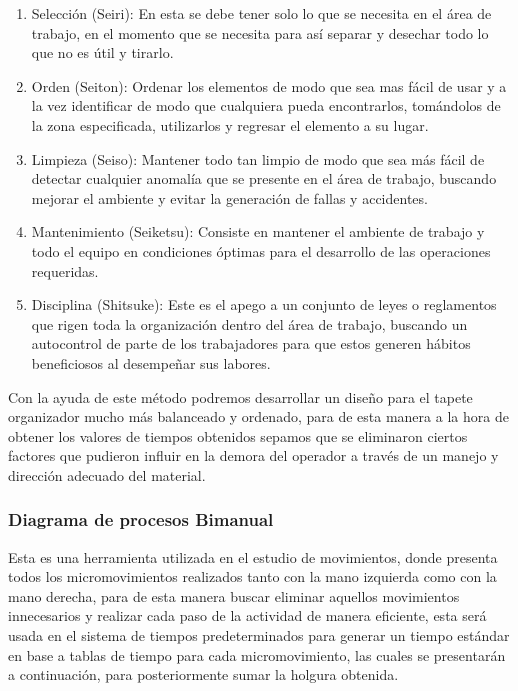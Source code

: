      \begin{enumerate}
         \item Selección (Seiri): En esta se debe tener solo lo que se necesita en el área de trabajo, en el momento que se necesita para así separar y desechar todo lo que no es útil y tirarlo.
         \item Orden (Seiton): Ordenar los elementos de modo que sea mas fácil de usar y a la vez identificar de modo que cualquiera pueda encontrarlos, tomándolos de la zona especificada, utilizarlos y regresar el elemento a su lugar.
         \item Limpieza (Seiso): Mantener todo tan limpio de modo que sea más fácil de detectar cualquier anomalía que se presente en el área de trabajo, buscando mejorar el ambiente y evitar la generación de fallas y accidentes.
         \item Mantenimiento (Seiketsu): Consiste en mantener el ambiente de trabajo y todo el equipo en condiciones óptimas para el desarrollo de las operaciones requeridas.
         \item Disciplina (Shitsuke): Este es el apego a un conjunto de leyes o reglamentos que rigen toda la organización dentro del área de trabajo, buscando un autocontrol de parte de los trabajadores para que estos generen hábitos beneficiosos al desempeñar sus labores.
     \end{enumerate}

     Con la ayuda de este método podremos desarrollar un diseño para el tapete organizador mucho más balanceado y ordenado, para de esta manera a la hora de obtener los valores de tiempos obtenidos sepamos que se eliminaron ciertos factores que pudieron influir en la demora del operador a través de un manejo y dirección adecuado del material.

\subsubsection{Diagrama de procesos Bimanual}
Esta es una herramienta utilizada en el estudio de movimientos, donde presenta todos los micromovimientos realizados tanto con la mano izquierda como con la mano derecha, para de esta manera buscar eliminar aquellos movimientos innecesarios y realizar cada paso de la actividad de manera eficiente, esta será usada en el sistema de tiempos predeterminados para generar un tiempo estándar en base a tablas de tiempo para cada micromovimiento, las cuales se presentarán a continuación, para posteriormente sumar la holgura obtenida.\cite{EstTrabajo} 

